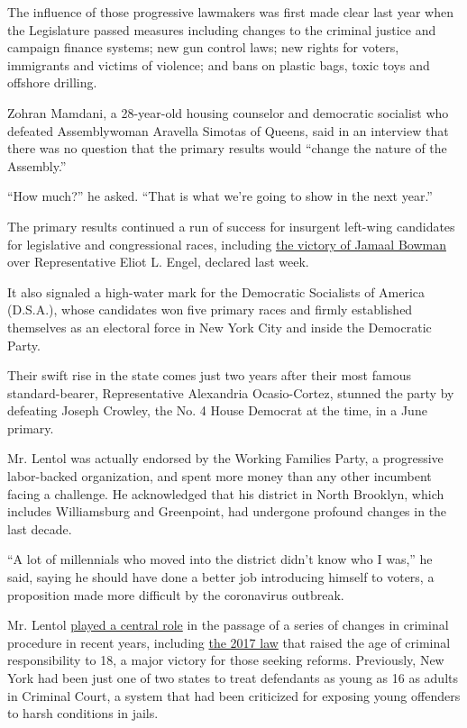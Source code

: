 The influence of those progressive lawmakers was first made clear last
year when the Legislature passed measures including changes to the
criminal justice and campaign finance systems; new gun control laws; new
rights for voters, immigrants and victims of violence; and bans on
plastic bags, toxic toys and offshore drilling.

Zohran Mamdani, a 28-year-old housing counselor and democratic socialist
who defeated Assemblywoman Aravella Simotas of Queens, said in an
interview that there was no question that the primary results would
``change the nature of the Assembly.''

``How much?'' he asked. ``That is what we're going to show in the next
year.''

The primary results continued a run of success for insurgent left-wing
candidates for legislative and congressional races, including
\href{https://www.nytimes.com/2020/07/17/nyregion/jamaal-bowman-eliot-engel.html}{the
victory of Jamaal Bowman} over Representative Eliot L. Engel, declared
last week.

It also signaled a high-water mark for the Democratic Socialists of
America (D.S.A.), whose candidates won five primary races and firmly
established themselves as an electoral force in New York City and inside
the Democratic Party.

Their swift rise in the state comes just two years after their most
famous standard-bearer, Representative Alexandria Ocasio-Cortez, stunned
the party by defeating Joseph Crowley, the No. 4 House Democrat at the
time, in a June primary.

Mr. Lentol was actually endorsed by the Working Families Party, a
progressive labor-backed organization, and spent more money than any
other incumbent facing a challenge. He acknowledged that his district in
North Brooklyn, which includes Williamsburg and Greenpoint, had
undergone profound changes in the last decade.

``A lot of millennials who moved into the district didn't know who I
was,'' he said, saying he should have done a better job introducing
himself to voters, a proposition made more difficult by the coronavirus
outbreak.

Mr. Lentol
\href{https://brooklyneagle.com/articles/2017/04/24/lentol-reveals-how-he-got-raise-the-age-passed/}{played
a central role} in the passage of a series of changes in criminal
procedure in recent years, including
\href{https://www.nytimes.com/2017/04/10/nyregion/raise-the-age-new-york.html}{the
2017 law} that raised the age of criminal responsibility to 18, a major
victory for those seeking reforms. Previously, New York had been just
one of two states to treat defendants as young as 16 as adults in
Criminal Court, a system that had been criticized for exposing young
offenders to harsh conditions in jails.

